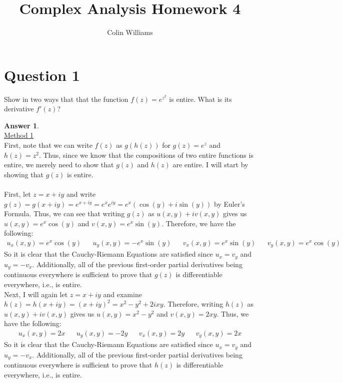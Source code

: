 \documentclass[10pt,a4paper]{article}
\title{Complex Analysis Homework 4}
\author{Colin Williams}
\theoremstyle{definition}
\newtheorem*{answer*}{Answer}
\begin{document}
\maketitle

\section*{Question 1}

Show in two ways that that the function $\displaystyle f(z) = e^{z^2}$ is entire. What is its derivative $f'(z)$?

\begin{answer*}{$ $}
\\\underline{Method 1}
\\First, note that we can write $f(z)$ as $g(h(z))$ for $g(z) = e^z$ and $h(z) = z^2$. Thus, since we know that the compositions of two entire functions is entire, we merely need to show that $g(z)$ and $h(z)$ are entire. I will start by showing that $g(z)$ is entire.
\\
\\First, let $z = x + iy$ and write $g(z) = g(x + iy) = e^{x + iy} = e^xe^{iy} = e^x(\cos(y) + i\sin(y))$ by Euler's Formula. Thus, we can see that writing $g(z)$ as $u(x,y) + iv(x,y)$ gives us $u(x,y) = e^x\cos(y)$ and $v(x,y) = e^x\sin(y)$. Therefore, we have the following:
\begin{align*}
u_x(x,y) = e^x\cos(y) && u_y(x,y) = -e^x\sin(y) && v_x(x,y) = e^x\sin(y) && v_y(x,y) = e^x\cos(y)
\end{align*}
So it is clear that the Cauchy-Riemann Equations are satisfied since $u_x = v_y$ and $u_y = -v_x$. Additionally, all of the previous first-order partial derivatives being continuous everywhere is sufficient to prove that $g(z)$ is differentiable everywhere, i.e., is entire.
\\Next, I will again let $z = x + iy$ and examine $h(z) = h(x + iy) = (x + iy)^2 = x^2 - y^2 + 2ixy$. Therefore, writing $h(z)$ as $u(x,y) + iv(x,y)$ gives us $u(x,y) = x^2 - y^2$ and $v(x,y) = 2xy$. Thus, we have the following:
\begin{align*}
u_x(x,y) = 2x && u_y(x,y)= -2y && v_x(x,y) = 2y && v_y(x,y) = 2x
\end{align*}
So it is clear that the Cauchy-Riemann Equations are satisfied since $u_x = v_y$ and $u_y = -v_x$. Additionally, all of the previous first-order partial derivatives being continuous everywhere is sufficient to prove that $h(z)$ is differentiable everywhere, i.e., is entire.
\\

\end{answer*}
\end{document}
